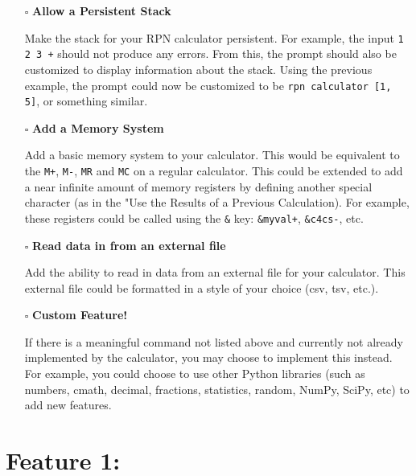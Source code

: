 \documentclass{article}
\begin{document}
\newpage

\begin{itemize}
  \item[$\square$] \textbf{Allow a Persistent Stack}
  
Make the stack for your RPN calculator persistent. For example, the input \texttt{1 2 3 +} should not produce any errors. From this, the prompt should also be customized to display information about the stack. Using the previous example, the prompt could now be customized to be \texttt{rpn calculator [1, 5]}, or something similar.

\end{itemize}

\begin{itemize}
  \item[$\square$] \textbf{Add a Memory System}
  
Add a basic memory system to your calculator. This would be equivalent to the \texttt{M+}, \texttt{M-}, \texttt{MR} and \texttt{MC} on a regular calculator. This could be extended to add a near infinite amount of memory registers by defining another special character (as in the "Use the Results of a Previous Calculation). For example, these registers could be called using the \texttt{\&} key: \texttt{\&myval+}, \texttt{\&c4cs-}, etc.

\end{itemize}

\begin{itemize}
	\item[$\square$] \textbf{Read data in from an external file}
	
Add the ability to read in data from an external file for your calculator. This external file could be formatted in a style of your choice (csv, tsv, etc.).
\end{itemize}

\begin{itemize}
  \item[$\square$] \textbf{Custom Feature!}
  
If there is a meaningful command not listed above and currently not already implemented by the calculator, you may choose to implement this instead. For example, you could choose to use other Python libraries (such as numbers, cmath, decimal, fractions, statistics, random, NumPy, SciPy, etc) to add new features. \newline
\end{itemize}

\newpage
\section*{Feature 1:}
\end{document}
